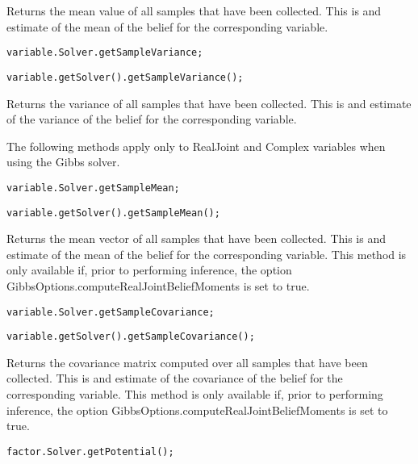 Returns the mean value of all samples that have been collected.  This is and estimate of the mean of the belief for the corresponding variable.

\ifmatlab
\begin{lstlisting}
variable.Solver.getSampleVariance;
\end{lstlisting}
\fi

\ifjava
\begin{lstlisting}
variable.getSolver().getSampleVariance();
\end{lstlisting}
\fi

Returns the variance of all samples that have been collected.  This is and estimate of the variance of the belief for the corresponding variable.


The following methods apply only to RealJoint and Complex variables when using the Gibbs solver.

\ifmatlab
\begin{lstlisting}
variable.Solver.getSampleMean;
\end{lstlisting}
\fi

\ifjava
\begin{lstlisting}
variable.getSolver().getSampleMean();
\end{lstlisting}
\fi

Returns the mean vector of all samples that have been collected.  This is and estimate of the mean of the belief for the corresponding variable.  This method is only available if, prior to performing inference, the option GibbsOptions.computeRealJointBeliefMoments is set to true.

\ifmatlab
\begin{lstlisting}
variable.Solver.getSampleCovariance;
\end{lstlisting}
\fi

\ifjava
\begin{lstlisting}
variable.getSolver().getSampleCovariance();
\end{lstlisting}
\fi

Returns the covariance matrix computed over all samples that have been collected.  This is and estimate of the covariance of the belief for the corresponding variable.  This method is only available if, prior to performing inference, the option GibbsOptions.computeRealJointBeliefMoments is set to true.


\ifmatlab
\begin{lstlisting}
factor.Solver.getPotential();
\end{lstlisting}
\fi

